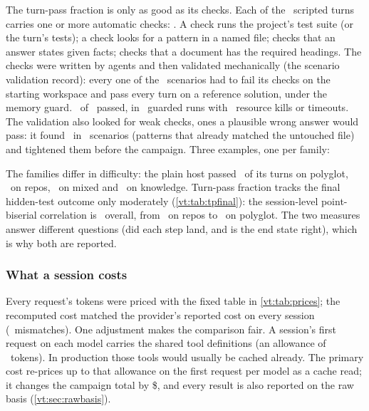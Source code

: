 The turn-pass fraction is only as good as its checks. Each of the \RgNTurnsScripted\ scripted turns carries one or
more automatic checks: \RgCheckKinds. A  check runs the project's test suite (or the turn's tests); a
 check looks for a pattern in a named file;  checks that an answer states given
facts;  checks that a document has the required headings. The checks were written by agents
and then validated mechanically (the scenario validation record): every one of the
\RgValN\ scenarios had to fail its checks on the starting workspace and pass every turn on a reference solution,
under the memory guard. \RgValOK\ of \RgValN\ passed, in \RgValRuns\ guarded runs with \RgValKills\ resource kills
or timeouts. The validation also looked for weak checks, ones a plausible wrong answer would pass: it found
\RgValWeak\ in \RgValWeakScen\ scenarios (patterns that already matched the untouched file) and tightened them before
the campaign. Three examples, one per family:


The families differ in difficulty: the plain host passed \RgAnchorTPPolyglot\ of its turns on polyglot,
\RgAnchorTPRepos\ on repos, \RgAnchorTPMixed\ on mixed and \RgAnchorTPKnowledge\ on knowledge. Turn-pass fraction
tracks the final hidden-test outcome only moderately (\cref{vt:tab:tpfinal}): the session-level point-biserial
correlation is \RgPbisAll\ overall, from \RgPbisRepos\ on repos to \RgPbisPolyglot\ on polyglot. The two
measures answer different questions (did each step land, and is the end state right), which is why both are
reported.

\begin{table}[tbp]
\centering\small
\caption{Correlation between a session's turn-pass fraction and whether it passed the final hidden tests
(point-biserial, all sessions), by arm and by family.}
\label{vt:tab:tpfinal}

\end{table}

\subsubsection{What a session costs}

Every request's tokens were priced with the fixed table in \cref{vt:tab:prices}; the recomputed cost matched
the provider's reported cost on every session (\CostMismatch\ mismatches). One adjustment makes the
comparison fair. A session's first request on each model carries the shared tool definitions (an allowance of
\ToolsAllowance\ tokens). In production those tools would usually be cached already. The primary
 cost re-prices up to that allowance on the first request per model as a cache read; it
changes the campaign total by \$\ToolsDeltaTotal, and every result is also reported on the raw basis
(\cref{vt:sec:rawbasis}).

